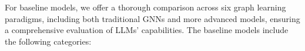 For baseline models, we offer a thorough comparison across six graph learning paradigms, including both traditional GNNs and more advanced models, ensuring a comprehensive evaluation of LLMs’ capabilities. The baseline models include the following categories:





